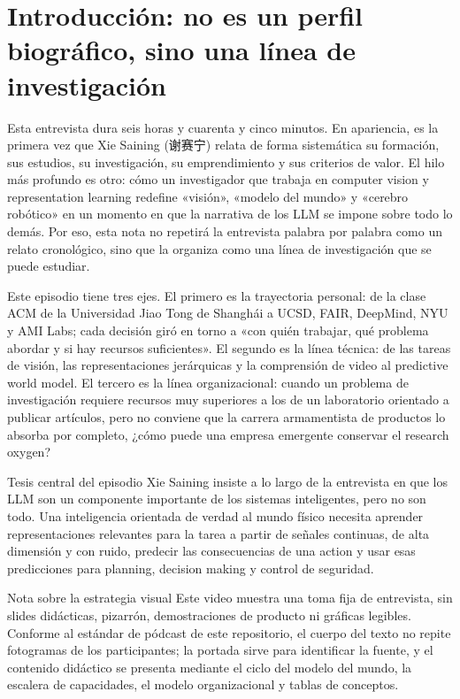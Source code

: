 \section{Introducción: no es un perfil biográfico, sino una línea de investigación}

Esta entrevista dura seis horas y cuarenta y cinco minutos. En apariencia, es la primera vez que Xie Saining (谢赛宁) relata de forma sistemática su formación, sus estudios, su investigación, su emprendimiento y sus criterios de valor. El hilo más profundo es otro: cómo un investigador que trabaja en computer vision y representation learning redefine «visión», «modelo del mundo» y «cerebro robótico» en un momento en que la narrativa de los LLM se impone sobre todo lo demás. Por eso, esta nota no repetirá la entrevista palabra por palabra como un relato cronológico, sino que la organiza como una línea de investigación que se puede estudiar.

Este episodio tiene tres ejes. El primero es la trayectoria personal: de la clase ACM de la Universidad Jiao Tong de Shanghái a UCSD, FAIR, DeepMind, NYU y AMI Labs; cada decisión giró en torno a «con quién trabajar, qué problema abordar y si hay recursos suficientes». El segundo es la línea técnica: de las tareas de visión, las representaciones jerárquicas y la comprensión de video al predictive world model. El tercero es la línea organizacional: cuando un problema de investigación requiere recursos muy superiores a los de un laboratorio orientado a publicar artículos, pero no conviene que la carrera armamentista de productos lo absorba por completo, ¿cómo puede una empresa emergente conservar el research oxygen?

\begin{importantbox}{Tesis central del episodio}
Xie Saining insiste a lo largo de la entrevista en que los LLM son un componente importante de los sistemas inteligentes, pero no son todo. Una inteligencia orientada de verdad al mundo físico necesita aprender representaciones relevantes para la tarea a partir de señales continuas, de alta dimensión y con ruido, predecir las consecuencias de una action y usar esas predicciones para planning, decision making y control de seguridad.
\end{importantbox}

\begin{knowledgebox}{Nota sobre la estrategia visual}
Este video muestra una toma fija de entrevista, sin slides didácticas, pizarrón, demostraciones de producto ni gráficas legibles. Conforme al estándar de pódcast de este repositorio, el cuerpo del texto no repite fotogramas de los participantes; la portada sirve para identificar la fuente, y el contenido didáctico se presenta mediante el ciclo del modelo del mundo, la escalera de capacidades, el modelo organizacional y tablas de conceptos.
\end{knowledgebox}

